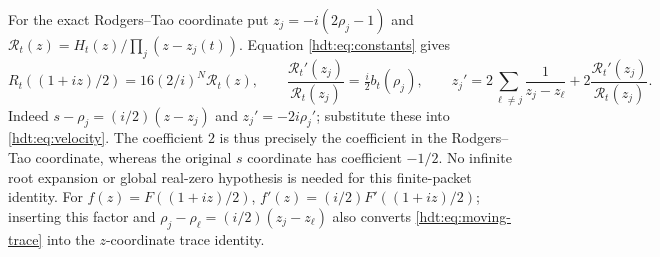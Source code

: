\documentclass[11pt]{article}
\begin{document}
For the exact Rodgers--Tao coordinate put
$z_j=-i(2\rho_j-1)$ and
$\mathcal R_t(z)=H_t(z)/\prod_j(z-z_j(t))$.
Equation \eqref{hdt:eq:constants} gives
\begin{equation}\label{hdt:eq:RT-coordinate}
R_t((1+iz)/2)=16(2/i)^N\mathcal R_t(z),\qquad
\frac{\mathcal R_t'(z_j)}{\mathcal R_t(z_j)}
=\tfrac i2 b_t(\rho_j),\qquad
z_j'=2\sum_{\ell\ne j}\frac1{z_j-z_\ell}
+2\frac{\mathcal R_t'(z_j)}{\mathcal R_t(z_j)}.
\end{equation}
Indeed $s-\rho_j=(i/2)(z-z_j)$ and $z_j'=-2i\rho_j'$;
substitute these into \eqref{hdt:eq:velocity}. The coefficient $2$
is thus precisely the coefficient in the Rodgers--Tao coordinate,
whereas the original $s$ coordinate has coefficient $-1/2$.
No infinite root expansion or global real-zero hypothesis is needed
for this finite-packet identity. For $f(z)=F((1+iz)/2)$,
$f'(z)=(i/2)F'((1+iz)/2)$; inserting this factor and
$\rho_j-\rho_\ell=(i/2)(z_j-z_\ell)$ also converts
\eqref{hdt:eq:moving-trace} into the $z$-coordinate trace identity.
\end{document}
